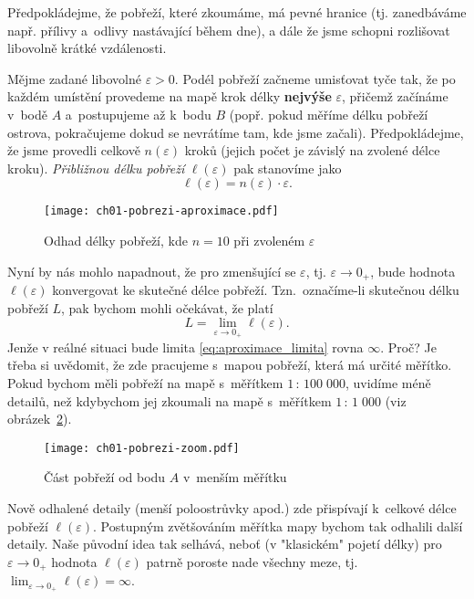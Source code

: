 Předpokládejme, že pobřeží, které zkoumáme, má pevné hranice (tj. zanedbáváme např. přílivy a~odlivy nastávající během dne), a dále že jsme schopni rozlišovat libovolně krátké vzdálenosti.\par
Mějme zadané libovolné $\varepsilon>0$. Podél pobřeží začneme umisťovat tyče tak, že po každém umístění provedeme na mapě krok délky \textbf{nejvýše} $\varepsilon$, přičemž začínáme v~bodě $A$ a~postupujeme až k~bodu $B$ (popř. pokud měříme délku pobřeží ostrova, pokračujeme dokud se nevrátíme tam, kde jsme začali). Předpokládejme, že jsme provedli celkově $n(\varepsilon)$ kroků (jejich počet je závislý na zvolené délce kroku). \emph{Přibližnou délku pobřeží} $\ell(\varepsilon)$ pak stanovíme jako
\begin{equation*}
    \ell(\varepsilon)=n(\varepsilon)\cdot\varepsilon.
\end{equation*}
\begin{figure}[h]
    \centering
    \texttt{[image: ch01-pobrezi-aproximace.pdf]}
    \caption{Odhad délky pobřeží, kde $n=10$ při zvoleném $\varepsilon$}
    \label{fig:pobrezi_aproximace}
\end{figure}
Nyní by nás mohlo napadnout, že pro zmenšující se $\varepsilon$, tj. $\varepsilon\to0_+$, bude hodnota $\ell(\varepsilon)$ konvergovat ke skutečné délce pobřeží. Tzn.~označíme-li skutečnou délku pobřeží $L$, pak bychom mohli očekávat, že platí
\begin{equation}\label{eq:aproximace_limita}
    L=\lim_{\varepsilon\to0_+}{\ell(\varepsilon)}.
\end{equation}
Jenže v reálné situaci bude limita \eqref{eq:aproximace_limita} rovna $\infty$. Proč? Je třeba si uvědomit, že zde pracujeme s~mapou pobřeží, která má určité měřítko. Pokud bychom měli pobřeží na mapě s~měřítkem $1\,:\,100\;000$, uvidíme méně detailů, než kdybychom jej zkoumali na mapě s~měřítkem $1\,:\,1\;000$ (viz obrázek~\ref{fig:pobrezi_zoom}).
\begin{figure}[h]
    \centering
    \texttt{[image: ch01-pobrezi-zoom.pdf]}
    \caption{Část pobřeží od bodu $A$ v~menším měřítku}
    \label{fig:pobrezi_zoom}
\end{figure}
Nově odhalené detaily (menší poloostrůvky apod.) zde přispívají k~celkové délce pobřeží $\ell(\varepsilon)$. Postupným zvětšováním měřítka mapy bychom tak odhalili další detaily. Naše původní idea tak selhává, neboť (v "klasickém" pojetí délky) pro $\varepsilon\to0_+$ hodnota $\ell(\varepsilon)$ patrně poroste nade všechny meze, tj. $\lim_{\varepsilon\to0_+}{\ell(\varepsilon)}=\infty$.\par
